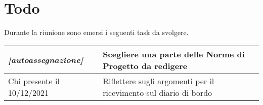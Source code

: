 \section{Todo}
Durante la riunione sono emersi i seguenti task da svolgere.

\begin{center}
  \begin{tabular}{|p{5cm}|p{7cm}|}
    \hline
    \textit{[autoassegnazione]} & Scegliere una parte delle Norme di Progetto da redigere  \\ \hline
    Chi presente il 10/12/2021 & Riflettere sugli argomenti per il ricevimento sul diario di bordo \\ \hline
  \end{tabular}
\end{center}
